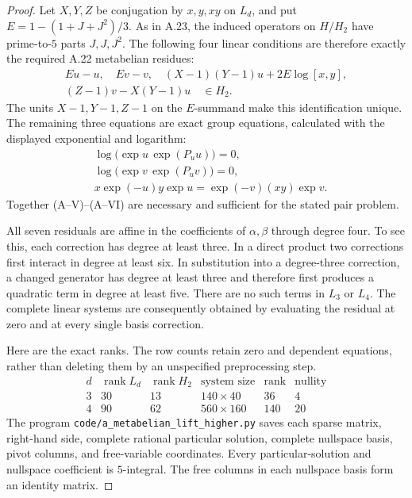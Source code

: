 \begin{proof}
Let $X,Y,Z$ be conjugation by $x,y,xy$ on $L_d$,
and put $E=1-(1+J+J^2)/3$. As in A.23, the
induced operators on $H/H_2$ have prime-to-$5$
parts $J,J,J^2$. The following four linear
conditions are therefore exactly the required
A.22 metabelian residues:
\[
 \begin{gathered}
 Eu-u,\quad Ev-v,\quad
 (X-1)(Y-1)u+2E\log[x,y],\\
 (Z-1)v-X(Y-1)u
                       \quad\in H_2.
 \end{gathered}                                                  \tag{A--V}
\]
The units $X-1,Y-1,Z-1$ on the $E$-summand
make this identification unique.
The remaining three equations are exact group
equations, calculated with the displayed
exponential and logarithm:
\[
 \begin{aligned}
 &\log\bigl(\exp u\,\exp(P_u u)\bigr)=0,\\
 &\log\bigl(\exp v\,\exp(P_u v)\bigr)=0,\\
 &x\exp(-u)y\exp u
             =\exp(-v)(xy)\exp v.
 \end{aligned}                                                   \tag{A--VI}
\]
Together (A--V)--(A--VI) are necessary and sufficient
for the stated pair problem.

All seven residuals are affine in the coefficients
of $\alpha,\beta$ through degree four. To see this,
each correction has degree at least three.
In a direct product two corrections first interact
in degree at least six. In substitution into a
degree-three correction, a changed generator has
degree at least three and therefore first produces
a quadratic term in degree at least five.
There are no such terms in $L_3$ or $L_4$.
The complete linear systems are consequently
obtained by evaluating the residual at zero and
at every single basis correction.

Here are the exact ranks. The row counts retain
zero and dependent equations, rather than deleting
them by an unspecified preprocessing step.
\[
\begin{array}{c|r|r|r|r|r}
d&\operatorname{rank}L_d&\operatorname{rank}H_2&
 \text{system size}&\text{rank}&\text{nullity}\\ \hline
3&30&13&140\times40&36&4\\
4&90&62&560\times160&140&20
\end{array}
\]
The program
\texttt{code/a\_metabelian\_lift\_higher.py}
saves each sparse matrix, right-hand side, complete
rational particular solution, complete nullspace
basis, pivot columns, and free-variable coordinates.
Every particular-solution and nullspace coefficient
is $5$-integral. The free columns in each nullspace
basis form an identity matrix.


\end{proof}

